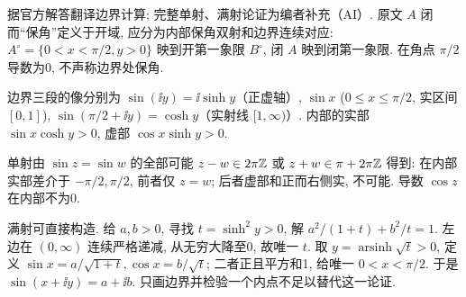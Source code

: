 \begin{solution}
据官方解答翻译边界计算; 完整单射、满射论证为编者补充（AI）. 原文 $A$ 闭而“保角”定义于开域, 应分为内部保角双射和边界连续对应: $A^\circ=\{0<x<\pi/2,y>0\}$ 映到开第一象限 $B^\circ$, 闭 $A$ 映到闭第一象限. 在角点 $\pi/2$ 导数为0, 不声称边界处保角.

边界三段的像分别为 $\sin(\ii y)=\ii\sinh y$（正虚轴）, $\sin x$ ($0\le x\le\pi/2$, 实区间 $[0,1]$), $\sin(\pi/2+\ii y)=\cosh y$（实射线 $[1,\infty)$）. 内部的实部 $\sin x\cosh y>0$, 虚部 $\cos x\sinh y>0$.

单射由 $\sin z=\sin w$ 的全部可能 $z-w\in2\pi\mathbb Z$ 或 $z+w\in\pi+2\pi\mathbb Z$ 得到: 在内部实部差介于 $-\pi/2,\pi/2$, 前者仅 $z=w$; 后者虚部和正而右侧实, 不可能. 导数 $\cos z$ 在内部不为0.

满射可直接构造. 给 $a,b>0$, 寻找 $t=\sinh^2y>0$, 解 $a^2/(1+t)+b^2/t=1$. 左边在 $(0,\infty)$ 连续严格递减, 从无穷大降至0, 故唯一 $t$. 取 $y=\operatorname{arsinh}\sqrt t>0$, 定义 $\sin x=a/\sqrt{1+t},\cos x=b/\sqrt t$; 二者正且平方和1, 给唯一 $0<x<\pi/2$. 于是 $\sin(x+\ii y)=a+\ii b$. 只画边界并检验一个内点不足以替代这一论证.
\begin{center}\end{center}
\end{solution}
